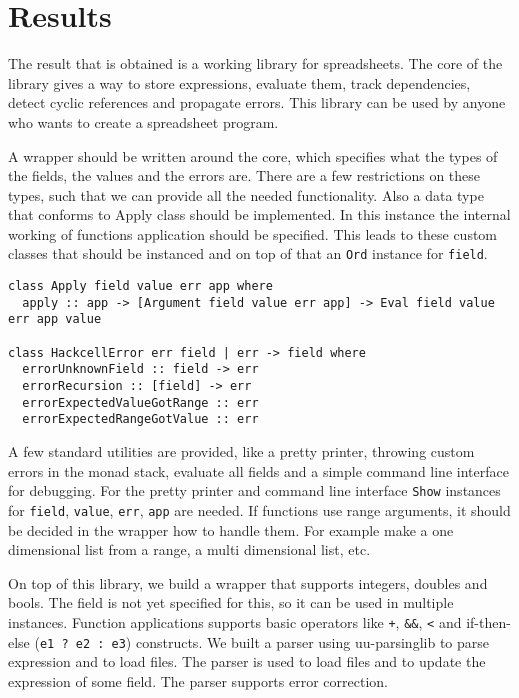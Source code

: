 \documentclass{article}
\begin{document}
	\section{Results}
	The result that is obtained is a working library for spreadsheets. The core of the library gives a way to store expressions, evaluate them, track dependencies, detect cyclic references and propagate errors. This library can be used by anyone who wants to create a spreadsheet program.

	A wrapper should be written around the core, which specifies what the types of the fields, the values and the errors are. There are a few restrictions on these types, such that we can provide all the needed functionality. Also a data type that conforms to Apply class should be implemented. In this instance the internal working of functions application should be specified. This leads to these custom classes that should be instanced and on top of that an \texttt{Ord} instance for \texttt{field}.
\begin{verbatim}
class Apply field value err app where
  apply :: app -> [Argument field value err app] -> Eval field value err app value
  
class HackcellError err field | err -> field where
  errorUnknownField :: field -> err
  errorRecursion :: [field] -> err
  errorExpectedValueGotRange :: err
  errorExpectedRangeGotValue :: err
\end{verbatim}
	
	A few standard utilities are provided, like a pretty printer, throwing custom errors in the monad stack, evaluate all fields and a simple command line interface for debugging. For the pretty printer and command line interface \texttt{Show} instances for \texttt{field}, \texttt{value}, \texttt{err}, \texttt{app} are needed. If functions use range arguments, it should be decided in the wrapper how to handle them. For example make a one dimensional list from a range, a multi dimensional list, etc.
	
	On top of this library, we build a wrapper that supports integers, doubles and bools. The field is not yet specified for this, so it can be used in multiple instances. Function applications supports basic operators like \texttt{+}, \texttt{\&\&}, \texttt{<} and if-then-else (\texttt{e1 ? e2 : e3}) constructs. We built a parser using uu-parsinglib to parse expression and to load files. The parser is used to load files and to update the expression of some field. The parser supports error correction.
	
\end{document}
